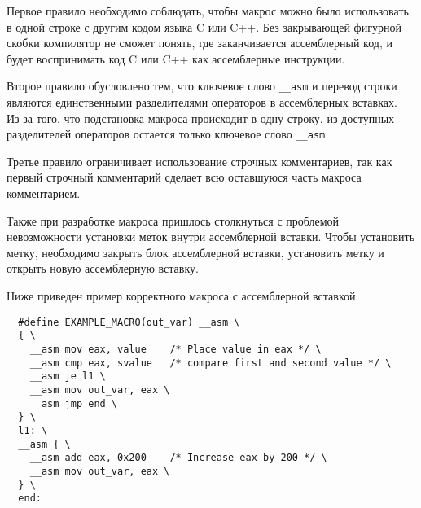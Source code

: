 Первое правило необходимо соблюдать, чтобы макрос можно было использовать в
одной строке с другим кодом языка C или C++. Без закрывающей фигурной скобки
компилятор не сможет понять, где заканчивается ассемблерный код, и будет
воспринимать код C или C++ как ассемблерные инструкции.

Второе правило обусловлено тем, что ключевое слово \verb!__asm! и перевод строки
являются единственными разделителями операторов в ассемблерных вставках. Из-за
того, что подстановка макроса происходит в одну строку, из доступных
разделителей операторов остается только ключевое слово \verb!__asm!.

Третье правило ограничивает использование строчных комментариев, так как первый
строчный комментарий сделает всю оставшуюся часть макроса комментарием.

Также при разработке макроса пришлось столкнуться с проблемой невозможности
установки меток внутри ассемблерной вставки. Чтобы установить метку,
необходимо закрыть блок ассемблерной вставки, установить метку и открыть новую
ассемблерную вставку.

Ниже приведен пример корректного макроса с ассемблерной вставкой.
\begin{verbatim}
  #define EXAMPLE_MACRO(out_var) __asm \
  { \
    __asm mov eax, value    /* Place value in eax */ \
    __asm cmp eax, svalue   /* compare first and second value */ \
    __asm je l1 \
    __asm mov out_var, eax \ 
    __asm jmp end \
  } \
  l1: \
  __asm { \
    __asm add eax, 0x200    /* Increase eax by 200 */ \
    __asm mov out_var, eax \
  } \
  end:
\end{verbatim}
